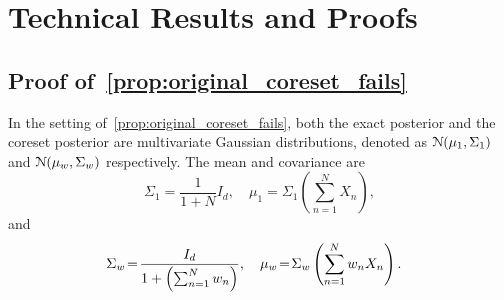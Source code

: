 \section{Technical Results and Proofs}
\label{supp:proofs}

\subsection{Proof of~\cref{prop:original_coreset_fails}}
In the setting of~\cref{prop:original_coreset_fails}, both the exact posterior and the coreset posterior 
are multivariate Gaussian distributions, denoted as $\mathcal{N}{\left(\mu_1, \Sigma_1\right)}$ and 
$\mathcal{N}{\left(\mu_{w}, \Sigma_{w}\right)}$ respectively. 
The mean and covariance are
\[
\Sigma_{1}=\frac{1}{1+ N} I_d, \quad \mu_{1}=\Sigma_{1}\left( \sum_{n=1}^{N} X_{n}\right), 
\label{eq:exact_post}
\]
and
\[
\label{eq:coreset_post}
\hspace{-.3cm}\Sigma_{w}\!=\!\frac{I_d}{1+ \left(\sum_{n=1}^N w_n\right)}, 
\quad
\mu_{w}\!=\!\Sigma_{w}\left( \sum_{n=1}^{N} w_n X_{n}\right).
\]

